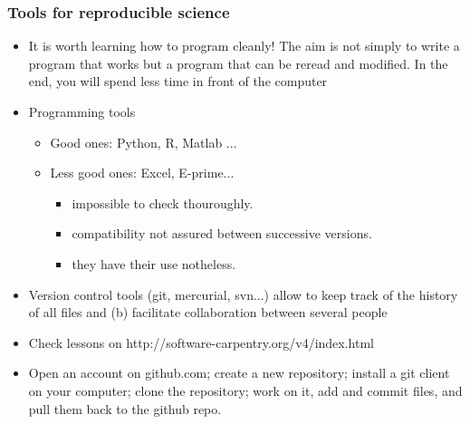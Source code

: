 \documentclass{beamer}
\begin{document}
\begin{frame}
\frametitle{Tools for reproducible science}


\begin{itemize}
  \item It is worth learning how to program cleanly! The aim is not simply to write a program that works but a program that can be reread and modified. In the end, you will spend less time in front of the computer

\pause

  \item Programming tools

    \begin{itemize}
    \item Good ones: Python, R, Matlab ...

    \item Less good ones: Excel, E-prime...

      \begin{itemize}
      \item impossible to check thouroughly.
      \item compatibility not assured between successive versions.
      \item they have their use notheless.
        
      \end{itemize}
    \end{itemize}

\pause

  \item Version control tools (git, mercurial, svn...) allow to 
    keep track of the history of all files and (b) facilitate collaboration between several people
  
\pause
\item Check lessons on http://software-carpentry.org/v4/index.html

\item {\small Open an account on github.com; create a new repository; install a git client on your computer; clone the repository; work on it, add and commit files, and pull them back to the github repo.}

\end{itemize}



\end{frame}

\end{document}

